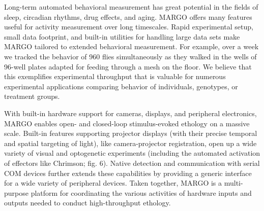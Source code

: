 \documentclass[10pt]{article}
\begin{document}
\begin{multicols}{2}
Long-term automated behavioral measurement has great potential in the fields of sleep, circadian rhythms, drug effects, and aging. MARGO offers many features useful for activity measurement over long timescales. Rapid experimental setup, small data footprint, and built-in utilities for handling large data sets make MARGO tailored to extended behavioral measurement. For example, over a week we tracked the behavior of 960 flies simultaneously as they walked in the wells of 96-well plates adapted for feeding through a mesh on the floor. We believe that this exemplifies experimental throughput that is valuable for numerous experimental applications comparing behavior of individuals, genotypes, or treatment groups. 

With built-in hardware support for cameras, displays, and peripheral electronics, MARGO enables open- and closed-loop stimulus-evoked ethology on a massive scale. Built-in features supporting projector displays (with their precise temporal and spatial targeting of light), like camera-projector registration, open up a wide variety of visual and optogenetic experiments (including the automated activation of effectors like Chrimson; fig. 6). Native detection and communication with serial COM devices further extends these capabilities by providing a generic interface for a wide variety of peripheral devices. Taken together, MARGO is a multi-purpose platform for coordinating the various activities of hardware inputs and outputs needed to conduct high-throughput ethology. 


\end{multicols}
\end{document}
